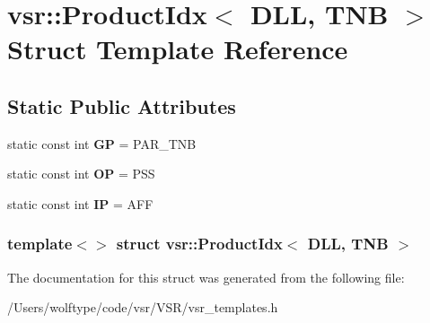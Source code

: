 \hypertarget{structvsr_1_1_product_idx_3_01_d_l_l_00_01_t_n_b_01_4}{\section{vsr\-:\-:Product\-Idx$<$ D\-L\-L, T\-N\-B $>$ Struct Template Reference}
\label{structvsr_1_1_product_idx_3_01_d_l_l_00_01_t_n_b_01_4}
}
\subsection*{Static Public Attributes}
\begin{DoxyCompactItemize}
\item 
\hypertarget{structvsr_1_1_product_idx_3_01_d_l_l_00_01_t_n_b_01_4_a9f73437309a3839822517b64b55b60c0}{static const int {\bfseries G\-P} = P\-A\-R\-\_\-\-T\-N\-B}\label{structvsr_1_1_product_idx_3_01_d_l_l_00_01_t_n_b_01_4_a9f73437309a3839822517b64b55b60c0}

\item 
\hypertarget{structvsr_1_1_product_idx_3_01_d_l_l_00_01_t_n_b_01_4_a9caf1547b815e1ee7de09607d0c56777}{static const int {\bfseries O\-P} = P\-S\-S}\label{structvsr_1_1_product_idx_3_01_d_l_l_00_01_t_n_b_01_4_a9caf1547b815e1ee7de09607d0c56777}

\item 
\hypertarget{structvsr_1_1_product_idx_3_01_d_l_l_00_01_t_n_b_01_4_a153e14d922d1b308eb04070683241ae4}{static const int {\bfseries I\-P} = A\-F\-F}\label{structvsr_1_1_product_idx_3_01_d_l_l_00_01_t_n_b_01_4_a153e14d922d1b308eb04070683241ae4}

\end{DoxyCompactItemize}
\subsubsection*{template$<$$>$ struct vsr\-::\-Product\-Idx$<$ D\-L\-L, T\-N\-B $>$}



The documentation for this struct was generated from the following file\-:\begin{DoxyCompactItemize}
\item 
/\-Users/wolftype/code/vsr/\-V\-S\-R/vsr\-\_\-templates.\-h\end{DoxyCompactItemize}
